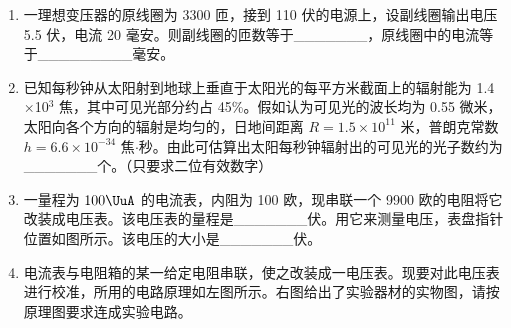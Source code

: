 \documentclass[\gkver]{gaokaozhenti}
\begin{document}
\begin{enumerate}
\item
一理想变压器的原线圈为 3300 匝，接到 110 伏的电源上，设副线圈输出电压 5.5 伏，电流 20 毫安。则副线圈的匝数等于\_\_\_\_\_\_\_，原线圈中的电流等于\_\_\_\_\_\_\_\_\_毫安。

\item
已知每秒钟从太阳射到地球上垂直于太阳光的每平方米截面上的辐射能为 1.4$\times$10$^{3}$ 焦，其中可见光部分约占 45\%。假如认为可见光的波长均为 0.55 微米，太阳向各个方向的辐射是均匀的，日地间距离 $R = 1.5\times10^{11}$ 米，普朗克常数 $h = 6.6\times10^{-34}$ 焦$\cdot$秒。由此可估算出太阳每秒钟辐射出的可见光的光子数约为\_\_\_\_\_\_\_个。（只要求二位有效数字）

\item
一量程为 $100\UuA$ 的电流表，内阻为 100 欧，现串联一个 9900 欧的电阻将它改装成电压表。该电压表的量程是\_\_\_\_\_\_\_伏。用它来测量电压，表盘指针位置如图所示。该电压的大小是\_\_\_\_\_\_\_伏。

\item
电流表与电阻箱的某一给定电阻串联，使之改装成一电压表。现要对此电压表进行校准，所用的电路原理如左图所示。右图给出了实验器材的实物图，请按原理图要求连成实验电路。


\end{enumerate}
\end{document}
